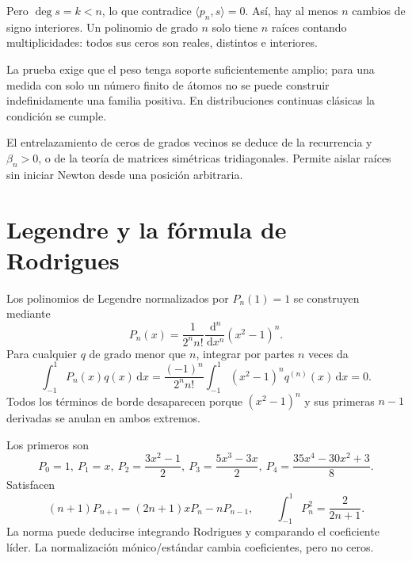 \documentclass[11pt,a4paper]{article}
\newcommand{\dd}{\,\mathrm d}
\theoremstyle{definition}
\begin{document}
Pero $\deg s=k<n$, lo que contradice $\langle p_n,s\rangle=0$. Así, hay al menos $n$ cambios de signo interiores. Un polinomio de grado $n$ solo tiene $n$ raíces contando multiplicidades: todos sus ceros son reales, distintos e interiores.

La prueba exige que el peso tenga soporte suficientemente amplio; para una medida con solo un número finito de átomos no se puede construir indefinidamente una familia positiva. En distribuciones continuas clásicas la condición se cumple.

El entrelazamiento de ceros de grados vecinos se deduce de la recurrencia y $\beta_n>0$, o de la teoría de matrices simétricas tridiagonales. Permite aislar raíces sin iniciar Newton desde una posición arbitraria.

\section{Legendre y la fórmula de Rodrigues}
Los polinomios de Legendre normalizados por $P_n(1)=1$ se construyen mediante
\[
P_n(x)=\frac1{2^n n!}\frac{\dd^n}{\dd x^n}(x^2-1)^n.
\]
Para cualquier $q$ de grado menor que $n$, integrar por partes $n$ veces da
\[
\int_{-1}^1P_n(x)q(x)\dd x
=\frac{(-1)^n}{2^n n!}\int_{-1}^1(x^2-1)^nq^{(n)}(x)\dd x=0.
\]
Todos los términos de borde desaparecen porque $(x^2-1)^n$ y sus primeras $n-1$ derivadas se anulan en ambos extremos.

Los primeros son
\[
P_0=1,\ P_1=x,\ P_2=\frac{3x^2-1}2,\ 
P_3=\frac{5x^3-3x}2,\ 
P_4=\frac{35x^4-30x^2+3}8.
\]
Satisfacen
\[
(n+1)P_{n+1}=(2n+1)xP_n-nP_{n-1},\qquad
\int_{-1}^1P_n^2=\frac2{2n+1}.
\]
La norma puede deducirse integrando Rodrigues y comparando el coeficiente líder. La normalización mónico/estándar cambia coeficientes, pero no ceros.
\end{document}
